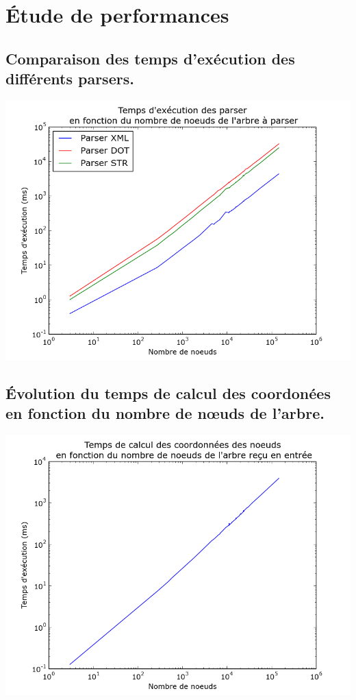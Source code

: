 \chapter{Étude de performances}

	\section{Comparaison des temps d'exécution des différents parsers.}
	
\begin{center}

\includegraphics[width=\columnwidth]{execTimeParsers}

\end{center}

	\section{Évolution du temps de calcul des coordonées en fonction du nombre de n\oe uds de l'arbre.}
	
\begin{center}

\includegraphics[width=\columnwidth]{execTimeCoord}

\end{center}

